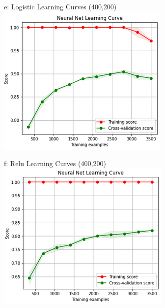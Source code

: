 \documentclass{article}
\begin{document}
\begin{figure}
\begin{subfigure}{.24\textwidth}
	\end{subfigure}
	\begin{subfigure}{.32\textwidth}
		\centering
		e: Logistic Learning Curves (400,200)\\
		\includegraphics[width=\linewidth]{mnist_nn_learning_logistic_400_200.png}
	\end{subfigure}
	\begin{subfigure}{.32\textwidth}
		\centering
		f: Relu Learning Curves (400,200)\\
		\includegraphics[width=\linewidth]{mnist_nn_learning_relu_400_200.png}
	\end{subfigure}
	\label{fig:test}
\end{figure}		
\end{document}
